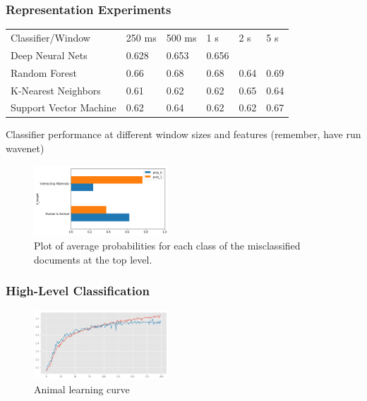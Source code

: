 \subsubsection{Representation Experiments}

\begin{table}[]
    \begin{tabular}{llllll}
    Classifier/Window       & 250 ms & 500 ms & 1 s   & 2 s  & 5 s   \\
    Deep Neural Nets        & 0.628  & 0.653  & 0.656 &      &       \\
    Random Forest           & 0.66   & 0.68   & 0.68  & 0.64 & 0.69  \\
    K-Nearest Neighbors     & 0.61   & 0.62   & 0.62  & 0.65 & 0.64 \\
    Support Vector Machine  & 0.62   & 0.64   & 0.62  & 0.62 & 0.67   
    \end{tabular}
\end{table}

Classifier performance at different window sizes and features (remember, have run wavenet)

\begin{figure}[h]
    \centering
    \includegraphics[width=0.45\textwidth]{figures/knn-prob-plot.png}
    \caption{Plot of average probabilities for each class of the misclassified documents at the top level.}
    \label{fig:a}
\end{figure}

\subsubsection{High-Level Classification}

\begin{figure}
    \centering
    \includegraphics[width=0.45\textwidth]{figures/anim-learning-curve.png}
    \caption{Animal learning curve}
    \label{fig:my-label}
\end{figure}

